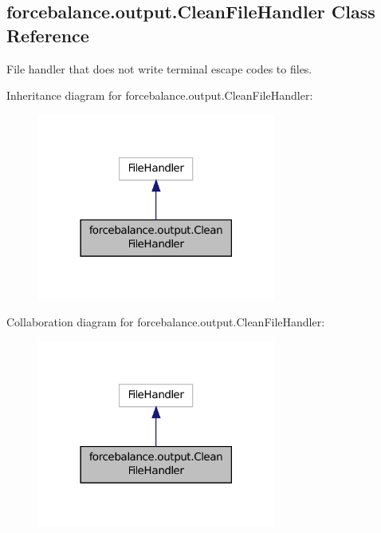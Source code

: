 \hypertarget{classforcebalance_1_1output_1_1CleanFileHandler}{\subsection{forcebalance.\-output.\-Clean\-File\-Handler Class Reference}
\label{classforcebalance_1_1output_1_1CleanFileHandler}
}


File handler that does not write terminal escape codes to files.  




Inheritance diagram for forcebalance.\-output.\-Clean\-File\-Handler\-:
\nopagebreak
\begin{figure}[H]
\begin{center}
\leavevmode
\includegraphics[width=222pt]{classforcebalance_1_1output_1_1CleanFileHandler__inherit__graph}
\end{center}
\end{figure}


Collaboration diagram for forcebalance.\-output.\-Clean\-File\-Handler\-:
\nopagebreak
\begin{figure}[H]
\begin{center}
\leavevmode
\includegraphics[width=222pt]{classforcebalance_1_1output_1_1CleanFileHandler__coll__graph}
\end{center}
\end{figure}
